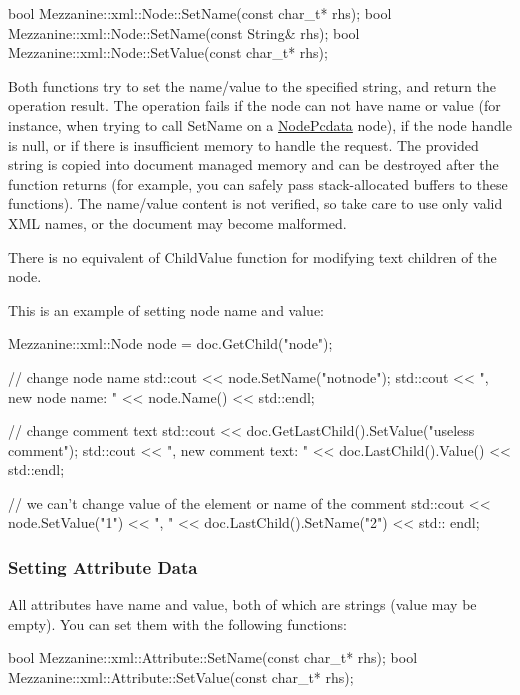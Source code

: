 \begin{DoxyCode}
 bool Mezzanine::xml::Node::SetName(const char_t* rhs);
 bool Mezzanine::xml::Node::SetName(const String& rhs);
 bool Mezzanine::xml::Node::SetValue(const char_t* rhs);
\end{DoxyCode}
 Both functions try to set the name/value to the specified string, and return the operation result. The operation fails if the node can not have name or value (for instance, when trying to call SetName on a \hyperlink{namespaceMezzanine_1_1xml_a524d867e34ff408b8f45a51b7924cb80}{NodePcdata} node), if the node handle is null, or if there is insufficient memory to handle the request. The provided string is copied into document managed memory and can be destroyed after the function returns (for example, you can safely pass stack-\/allocated buffers to these functions). The name/value content is not verified, so take care to use only valid XML names, or the document may become malformed. \par
 \par
 There is no equivalent of ChildValue function for modifying text children of the node. \par
 \par
 This is an example of setting node name and value: 
\begin{DoxyCode}
 Mezzanine::xml::Node node = doc.GetChild("node");

 // change node name
 std::cout << node.SetName("notnode");
 std::cout << ", new node name: " << node.Name() << std::endl;

 // change comment text
 std::cout << doc.GetLastChild().SetValue("useless comment");
 std::cout << ", new comment text: " << doc.LastChild().Value() << std::endl;

 // we can't change value of the element or name of the comment
 std::cout << node.SetValue("1") << ", " << doc.LastChild().SetName("2") << std::
      endl;
\end{DoxyCode}
 \hypertarget{XMLManual_XMLModifyingAttributeData}{}\subsubsection{Setting Attribute Data}\label{XMLManual_XMLModifyingAttributeData}
All attributes have name and value, both of which are strings (value may be empty). You can set them with the following functions: 
\begin{DoxyCode}
 bool Mezzanine::xml::Attribute::SetName(const char_t* rhs);
 bool Mezzanine::xml::Attribute::SetValue(const char_t* rhs);
\end{DoxyCode}
